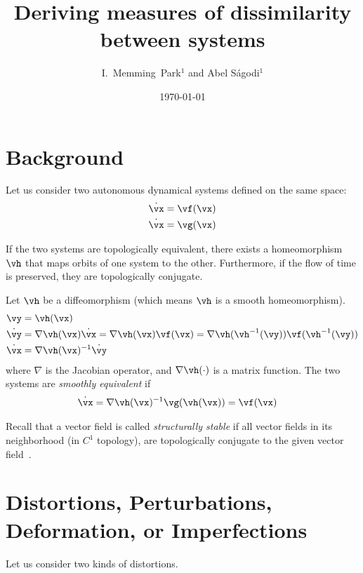 \documentclass[a4paper,twoside]{article}
\title{Deriving measures of dissimilarity between systems}
\author{
I.~Memming~Park$^{1}$ and
Abel S\'agodi$^{1}$
}
\date{\today}
\newcounter{ct}
\newcommand{\inv}{^{-1}}
\newcommand{\homeo}{\vh}
\newcommand{\invhomeo}{\homeo\inv}
\begin{document}
\maketitle
\thispagestyle{fancy}

\section{Background}
Let us consider two autonomous dynamical systems defined on the same space:
\begin{align}
    \dot{\vx} &= \vf(\vx)
    \\
    \dot{\vx} &= \vg(\vx)
\end{align}

If the two systems are topologically equivalent, there exists a homeomorphism $\homeo$ that maps orbits of one system to the other.
 Furthermore, if the flow of time is preserved, they are topologically conjugate.

Let $\homeo$ be a diffeomorphism (which means $\homeo$ is a smooth homeomorphism).
\begin{align}
    \vy &= \homeo(\vx)
    \\
    \dot{\vy} &=
	\nabla\homeo(\vx)\dot{\vx}
    =
	\nabla\homeo(\vx) \vf(\vx)
    =
	\nabla\homeo(\invhomeo(\vy)) \vf(\invhomeo(\vy))
	\label{eq:distortion:homeo}
    \\
    \dot{\vx} &= \nabla\homeo(\vx)\inv \dot{\vy}
\end{align}
where $\nabla$ is the Jacobian operator, and $\nabla\homeo(\cdot)$ is a matrix function.
The two systems are \emph{smoothly equivalent} if
\begin{align}
    \dot{\vx} &= \nabla\homeo(\vx)\inv \vg(\homeo(\vx)) = \vf(\vx)
\end{align}

Recall that a vector field is called \emph{structurally stable} if all vector fields in its neighborhood (in $C^1$ topology), are topologically conjugate to the given vector field~\cite{Chicone2006}.

\section{Distortions, Perturbations, Deformation, or Imperfections}
Let us consider two kinds of distortions.
\end{document}
